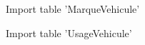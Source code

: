 Import table 'MarqueVehicule'
\begin{figure}[H]
\centering
{}
\end{figure}

Import table 'UsageVehicule'
\begin{figure}[H]
\centering
{}
\end{figure}

